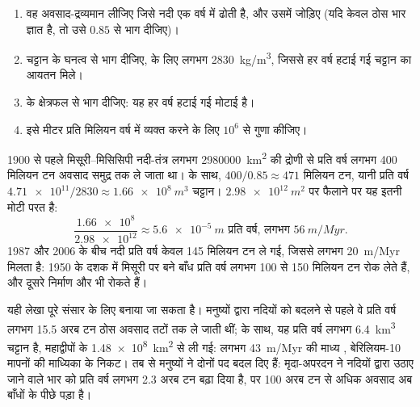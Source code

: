 \begin{method}[अपरदन-लेखा]\label{met:g12:destruction-of-mountains:budget}
\begin{enumerate}
  \item वह अवसाद-द्रव्यमान लीजिए जिसे नदी एक वर्ष में ढोती है, और उसमें
         जोड़िए (यदि केवल ठोस भार ज्ञात है, तो उसे
        $0.85$ से भाग दीजिए)।
  \item चट्टान के घनत्व से भाग दीजिए,  के लिए लगभग \qty{2830}{kg/m^3},
        जिससे हर वर्ष हटाई गई चट्टान का आयतन मिले।
  \item {} के क्षेत्रफल से भाग दीजिए: यह हर वर्ष हटाई गई
        मोटाई है।
  \item इसे मीटर प्रति मिलियन वर्ष में व्यक्त करने के लिए $10^6$ से गुणा कीजिए।
\end{enumerate}
\end{method}

\begin{example}[मिसिसिपी]\label{ex:g12:destruction-of-mountains:mississippi}
1900 से पहले मिसूरी--मिसिसिपी नदी-तंत्र लगभग
\qty{2980000}{km^2} की द्रोणी से प्रति वर्ष लगभग 400 मिलियन टन अवसाद समुद्र तक ले जाता था।
 के साथ, $400/0.85 \approx 471$ मिलियन
टन, यानी प्रति वर्ष $\num{4.71e11}/2830 \approx \qty{1.66e8}{m^3}$ चट्टान।
$\qty{2.98e12}{m^2}$ पर फैलाने पर यह इतनी मोटी परत है:
\[
  \frac{\num{1.66e8}}{\num{2.98e12}} \approx \qty{5.6e-5}{m}
  \text{ प्रति वर्ष, लगभग } \qty{56}{m/Myr}.
\]
1987 और 2006 के बीच नदी प्रति वर्ष केवल 145 मिलियन टन ले गई, जिससे
लगभग \qty{20}{m/Myr} मिलता है: 1950 के दशक में मिसूरी पर बने बाँध
प्रति वर्ष लगभग 100 से 150 मिलियन टन रोक लेते हैं, और दूसरे निर्माण और भी रोकते हैं।
\end{example}

यही लेखा पूरे संसार के लिए बनाया जा सकता है। मनुष्यों द्वारा नदियों को बदलने से
पहले वे प्रति वर्ष लगभग 15.5 अरब टन ठोस अवसाद तटों तक ले जाती थीं;
 के साथ, यह प्रति वर्ष लगभग \qty{6.4}{km^3} चट्टान है,
महाद्वीपों के \qty{1.48e8}{km^2} से ली गई: लगभग \qty{43}{m/Myr} की
माध्य , बेरिलियम-10 मापनों की माध्यिका के निकट।
तब से मनुष्यों ने दोनों पद बदल दिए हैं: मृदा-अपरदन ने नदियों द्वारा उठाए जाने वाले भार को
प्रति वर्ष लगभग 2.3 अरब टन बढ़ा दिया है, पर
100 अरब टन से अधिक अवसाद अब बाँधों के पीछे पड़ा है।

